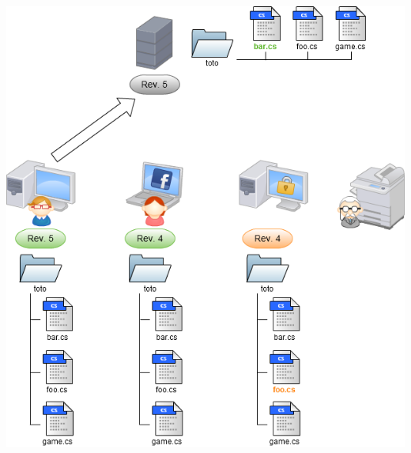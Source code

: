 \begin{frame}
  \begin{center}
    \includegraphics[scale=0.3]{images/4-Commit1.png}
  \end{center}
\end{frame}


